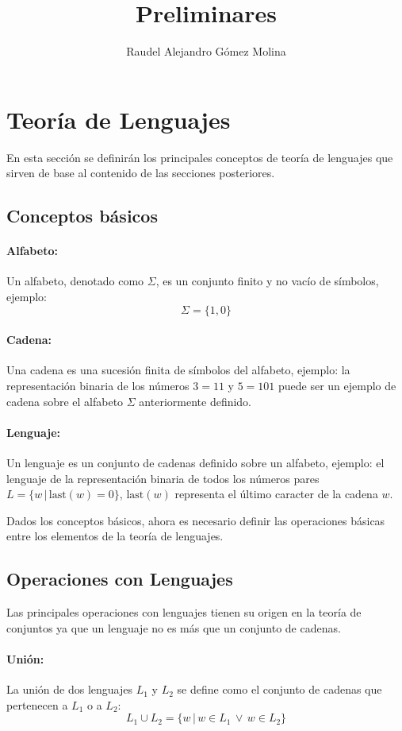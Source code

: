 \documentclass[12pt]{article}
\title{Preliminares}
\author{Raudel Alejandro Gómez Molina}
\begin{document}
\maketitle

\section{Teoría de Lenguajes}

En esta sección se definirán los principales conceptos de teoría de lenguajes que sirven de base al contenido de las secciones posteriores.

\subsection{Conceptos básicos}

\paragraph{Alfabeto:} Un alfabeto, denotado como $\Sigma$, es un conjunto finito y no vacío de símbolos, ejemplo:
$$\Sigma=\{1,0\}$$
\paragraph{Cadena:} Una cadena es una sucesión finita de símbolos del alfabeto, ejemplo: la representación binaria de
los números $3=11$ y $5=101$ puede ser un ejemplo de cadena sobre el alfabeto $\Sigma$ anteriormente
definido.
\paragraph{Lenguaje:} Un lenguaje es un conjunto de cadenas definido sobre un alfabeto, ejemplo: el lenguaje de la
representación binaria de todos los números pares $L=\{w\,|\,\text{last}(w)=0\}$, $\text{last}(w)$
representa el último caracter de la cadena $w$.

Dados los conceptos básicos, ahora es necesario definir las operaciones básicas entre los elementos de la teoría de lenguajes.

\subsection{Operaciones con Lenguajes}

Las principales operaciones con lenguajes tienen su origen en la teoría de conjuntos ya que un lenguaje no es más que
un conjunto de cadenas.

\paragraph{Unión:} La unión de dos lenguajes $L_1$ y $L_2$ se define como el conjunto de cadenas que
pertenecen a $L_1$ o a $L_2$:
$$L_1\cup L_2=\{w\,|\,w\in L_1\,\vee\,w\in L_2\}$$
\end{document}
